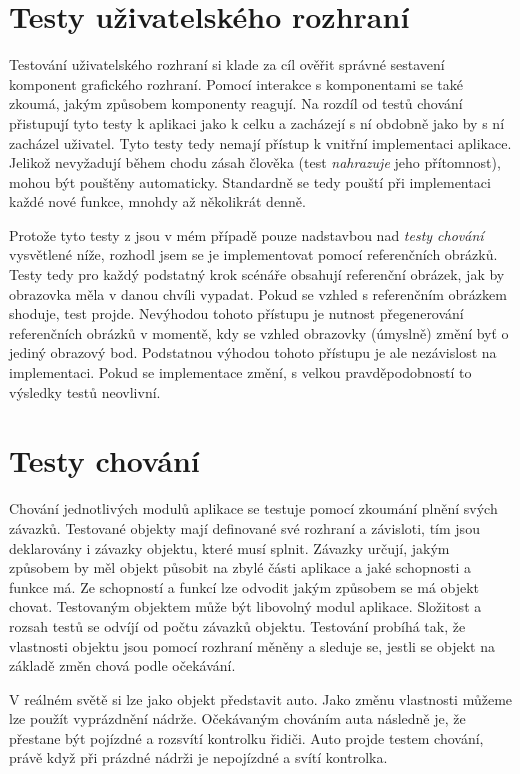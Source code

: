 \section{Testy uživatelského rozhraní}\label{testovani-ui}

Testování uživatelského rozhraní si klade za cíl ověřit správné sestavení komponent grafického rozhraní.
Pomocí interakce s komponentami se také zkoumá, jakým způsobem komponenty reagují.
Na rozdíl od testů chování přistupují tyto testy k aplikaci jako k celku a zacházejí s ní obdobně jako by s ní zacházel uživatel. Tyto testy tedy nemají přístup k vnitřní implementaci aplikace.
Jelikož nevyžadují během chodu zásah člověka (test \textit{nahrazuje} jeho přítomnost), mohou být pouštěny automaticky.
Standardně se tedy pouští při implementaci každé nové funkce, mnohdy až několikrát denně. \cite{apple-ui-testing}

Protože tyto testy z jsou v mém případě pouze nadstavbou nad \textit{testy chování} vysvětlené níže, rozhodl jsem se je implementovat pomocí referenčních obrázků.
Testy tedy pro každý podstatný krok scénáře obsahují referenční obrázek, jak by obrazovka měla v danou chvíli vypadat.
Pokud se vzhled s referenčním obrázkem shoduje, test projde.
Nevýhodou tohoto přístupu je nutnost přegenerování referenčních obrázků v momentě, kdy se vzhled obrazovky (úmyslně) změní byť o jediný obrazový bod.
Podstatnou výhodou tohoto přístupu je ale nezávislost na implementaci.
Pokud se implementace změní, s velkou pravděpodobností to výsledky testů neovlivní.

\section{Testy chování}\label{testovani-bdd}

Chování jednotlivých modulů aplikace se testuje pomocí zkoumání plnění svých závazků.
Testované objekty mají definované své rozhraní a závisloti, tím jsou deklarovány i závazky objektu, které musí splnit.
Závazky určují, jakým způsobem by měl objekt působit na zbylé části aplikace a jaké schopnosti a funkce má.
Ze schopností a funkcí lze odvodit jakým způsobem se má objekt chovat.
Testovaným objektem může být libovolný modul aplikace.
Složitost a rozsah testů se odvíjí od počtu závazků objektu.
Testování probíhá tak, že vlastnosti objektu jsou pomocí rozhraní měněny a sleduje se, jestli se objekt na základě změn chová podle očekávání. \cite{objcio-bdd}

V reálném světě si lze jako objekt představit auto.
Jako změnu vlastnosti můžeme lze použít vyprázdnění nádrže.
Očekávaným chováním auta následně je, že přestane být pojízdné a rozsvítí kontrolku řidiči.
Auto projde testem chování, právě když při prázdné nádrži je nepojízdné a svítí kontrolka.


